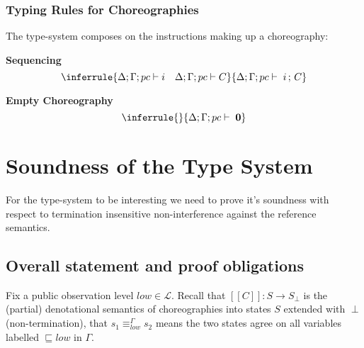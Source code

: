 \documentclass[12pt,a4paper,twoside]{book}
\newcommand{\llbracket}{[\![}
\newcommand{\rrbracket}{]\!]}
\newcommand{\MCL}{\mathscr{L}}
\begin{document}
\subsection{Typing Rules for Choreographies}
The type-system composes on the instructions making up a choreography:

\medskip
\noindent\textbf{Sequencing}
\[
  \inferrule
  { \Delta;\Gamma;pc \vdash i \quad \Delta;\Gamma;pc \vdash C }
  { \Delta;\Gamma;pc \vdash \; i \,;\, C }
\]

\medskip
\noindent\textbf{Empty Choreography}
\[
  \inferrule
  {}{\Delta;\Gamma;pc \vdash \; \boldsymbol{0}}
\]

\chapter{Soundness of the Type System}
For the type-system to be interesting we need to prove it's soundness with respect to termination insensitive non-interference against the reference semantics.

\section{Overall statement and proof obligations}

Fix a public observation level \(low \in \MCL\).
Recall that \( \llbracket C \rrbracket : S \to S_\perp \) is the (partial) denotational semantics of choreographies into states \(S\) extended with \(\perp\) (non-termination), that \(s_1 \equiv^\Gamma_{low} s_2\) means the two states agree on all variables labelled \(\sqsubseteq low\) in $\Gamma$.
\end{document}
